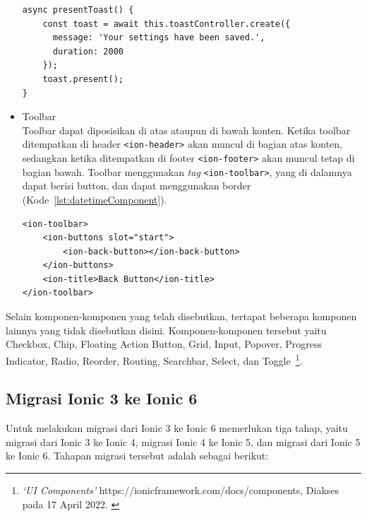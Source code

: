 \begin{itemize}
\begin{lstlisting}[label={lst:toastComponent}, caption=Kode Program dari Toast]
async presentToast() {
    const toast = await this.toastController.create({
      message: 'Your settings have been saved.',
      duration: 2000
    });
    toast.present();
}
\end{lstlisting}
		

	\item Toolbar \\
	Toolbar dapat diposisikan di atas ataupun di bawah konten. Ketika toolbar ditempatkan di header \texttt{<ion-header>} akan muncul di bagian atas konten, sedangkan ketika ditempatkan di footer \texttt{<ion-footer>} akan muncul tetap di bagian bawah. Toolbar menggunakan {\it tag} \texttt{<ion-toolbar>}, yang di dalamnya dapat berisi button, dan dapat menggunakan border (Kode~\ref{lst:datetimeComponent}).

\begin{lstlisting}[label={lst:datetimeComponent}, caption=Kode Program dari Toolbar dengan Button di Dalamnya]
<ion-toolbar>
	<ion-buttons slot="start">
		<ion-back-button></ion-back-button>
	</ion-buttons>
	<ion-title>Back Button</ion-title>
</ion-toolbar>
\end{lstlisting} 
\end{itemize}
	Selain komponen-komponen yang telah disebutkan, tertapat beberapa komponen lainnya yang tidak disebutkan disini. Komponen-komponen tersebut yaitu Checkbox, Chip, Floating Action Button, Grid, Input, Popover, Progress Indicator, Radio, Reorder, Routing, Searchbar, Select, dan Toggle~\footnote{\textit{`UI Components'} https://ionicframework.com/docs/components, Diakses pada 17 April 2022. \label{ref:uiComponents}}.

\subsection{Migrasi Ionic 3 ke Ionic 6}
\label{subsec:migrasi}

Untuk melakukan migrasi dari Ionic 3 ke Ionic 6 memerlukan tiga tahap, yaitu migrasi dari Ionic 3 ke Ionic 4, migrasi Ionic 4 ke Ionic 5, dan migrasi dari Ionic 5 ke Ionic 6. Tahapan migrasi tersebut adalah sebagai berikut:


